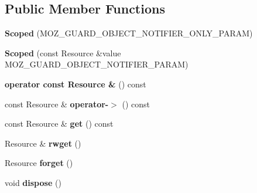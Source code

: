 \subsection*{Public Member Functions}
\begin{DoxyCompactItemize}
\item 
\hypertarget{classmozilla_1_1_scoped_a2b8514619b6ae91168306d5c18a8c9fe}{{\bfseries Scoped} (M\-O\-Z\-\_\-\-G\-U\-A\-R\-D\-\_\-\-O\-B\-J\-E\-C\-T\-\_\-\-N\-O\-T\-I\-F\-I\-E\-R\-\_\-\-O\-N\-L\-Y\-\_\-\-P\-A\-R\-A\-M)}\label{classmozilla_1_1_scoped_a2b8514619b6ae91168306d5c18a8c9fe}

\item 
\hypertarget{classmozilla_1_1_scoped_ad0830659fb60460bfeba55c4d7945de7}{{\bfseries Scoped} (const Resource \&value M\-O\-Z\-\_\-\-G\-U\-A\-R\-D\-\_\-\-O\-B\-J\-E\-C\-T\-\_\-\-N\-O\-T\-I\-F\-I\-E\-R\-\_\-\-P\-A\-R\-A\-M)}\label{classmozilla_1_1_scoped_ad0830659fb60460bfeba55c4d7945de7}

\item 
\hypertarget{classmozilla_1_1_scoped_a7ee3e27ca3f2afd2f161b3206b1d310f}{{\bfseries operator const Resource \&} () const }\label{classmozilla_1_1_scoped_a7ee3e27ca3f2afd2f161b3206b1d310f}

\item 
\hypertarget{classmozilla_1_1_scoped_ab3a315f401dcdc66ed184b6747d157ee}{const Resource \& {\bfseries operator-\/$>$} () const }\label{classmozilla_1_1_scoped_ab3a315f401dcdc66ed184b6747d157ee}

\item 
\hypertarget{classmozilla_1_1_scoped_ae812a5fb56e9b5948fa3db0a36c42f3a}{const Resource \& {\bfseries get} () const }\label{classmozilla_1_1_scoped_ae812a5fb56e9b5948fa3db0a36c42f3a}

\item 
\hypertarget{classmozilla_1_1_scoped_ab0ae6cd041849c5957dee8cfe9ff912a}{Resource \& {\bfseries rwget} ()}\label{classmozilla_1_1_scoped_ab0ae6cd041849c5957dee8cfe9ff912a}

\item 
\hypertarget{classmozilla_1_1_scoped_a8e0297c73f06fa38b9559b83bbe426d3}{Resource {\bfseries forget} ()}\label{classmozilla_1_1_scoped_a8e0297c73f06fa38b9559b83bbe426d3}

\item 
\hypertarget{classmozilla_1_1_scoped_a15de165b74aeae8d2c33d5a19198937b}{void {\bfseries dispose} ()}\label{classmozilla_1_1_scoped_a15de165b74aeae8d2c33d5a19198937b}


\end{DoxyCompactItemize}

